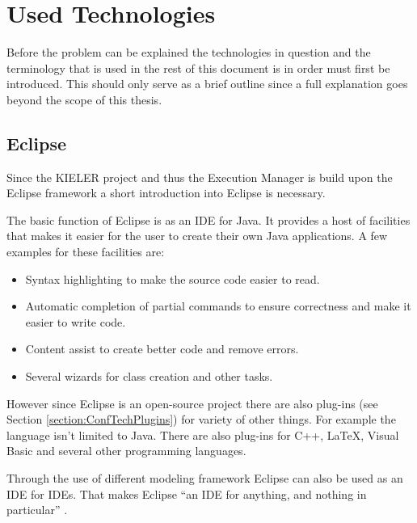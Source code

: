 \chapter{Used Technologies}
\label{chapter:ConfTechnology}
Before the problem can be explained the technologies in question
and the terminology that is used in the rest of this document is in order must first be introduced. This should
only serve as a brief outline since a full explanation goes beyond the scope of this
thesis.

\section{Eclipse}
\label{section:ConfTechEclipse}
Since the \ac{KIELER} project and thus the Execution Manager is build upon the 
Eclipse framework a short introduction into Eclipse is necessary.

The basic function of Eclipse is as an \ac{IDE} for Java. It provides
a host of facilities that makes it easier for the user to create their own Java applications.
A few examples for these facilities are:
\begin{itemize}
 \item Syntax highlighting to make the source code easier to read.
 \item Automatic completion of partial commands to ensure correctness
and make it easier to write code.
 \item Content assist to create better code and remove errors.
 \item Several wizards for class creation and other tasks.
\end{itemize}

However since Eclipse is an open-source project there are also plug-ins (see Section 
\ref{section:ConfTechPlugins}) for variety of other things. 
For example the language isn't limited to Java. There are also plug-ins
for C++, \LaTeX, Visual Basic and several other programming languages.

Through the use of different modeling framework Eclipse can also be used as an \ac{IDE}
for \ac{IDE}s. That makes Eclipse ``an IDE for anything, and nothing in particular'' \cite{eclipseOverview}.


